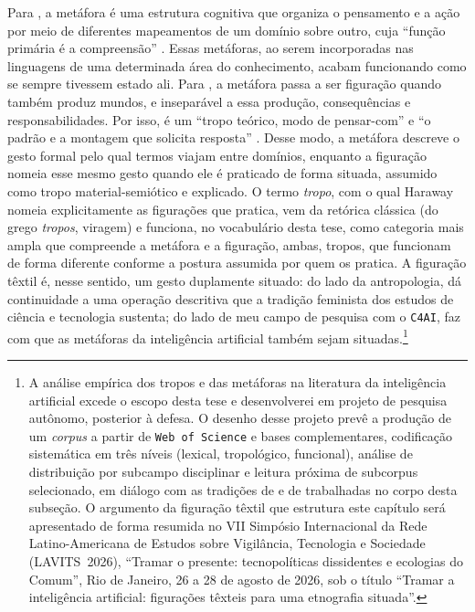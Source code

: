 Para \textcite{LakoffJohnson1980Metaphors}, a metáfora é uma estrutura cognitiva que organiza o pensamento e a ação por meio de diferentes mapeamentos de um domínio sobre outro, cuja \enquote{função primária é a compreensão} \parencite[p.~36, tradução minha]{LakoffJohnson1980Metaphors}. Essas metáforas, ao serem incorporadas nas linguagens de uma determinada área do conhecimento, acabam funcionando como se sempre tivessem estado ali. Para \textcite{Haraway2016Staying}, a metáfora passa a ser figuração quando também produz mundos, e inseparável a essa produção, consequências e responsabilidades. Por isso, é um \enquote{tropo teórico, modo de pensar-com} e \enquote{o padrão e a montagem que solicita resposta} \parencite[p.~3, tradução minha]{Haraway2016Staying}. Desse modo, a metáfora descreve o gesto formal pelo qual termos viajam entre domínios, enquanto a figuração nomeia esse mesmo gesto quando ele é praticado de forma situada, assumido como tropo material-semiótico e explicado. O termo \textit{tropo}, com o qual Haraway nomeia explicitamente as figurações que pratica, vem da retórica clássica (do grego \textit{tropos}, viragem) e funciona, no vocabulário desta tese, como categoria mais ampla que compreende a metáfora e a figuração, ambas, tropos, que funcionam de forma diferente conforme a postura assumida por quem os pratica. A figuração têxtil é, nesse sentido, um gesto duplamente situado: do lado da antropologia, dá continuidade a uma operação descritiva que a tradição feminista dos estudos de ciência e tecnologia sustenta; do lado de meu campo de pesquisa com o \texttt{C4AI}, faz com que as metáforas da inteligência artificial também sejam situadas.\footnote{A análise empírica dos tropos e das metáforas na literatura da inteligência artificial excede o escopo desta tese e desenvolverei em projeto de pesquisa autônomo, posterior à defesa. O desenho desse projeto prevê a produção de um \textit{corpus} a partir de \texttt{Web of Science} e bases complementares, codificação sistemática em três níveis (lexical, tropológico, funcional), análise de distribuição por subcampo disciplinar e leitura próxima de subcorpus selecionado, em diálogo com as tradições de \textcite{LakoffJohnson1980Metaphors} e de \textcite{Haraway2023Ficar} trabalhadas no corpo desta subseção. O argumento da figuração têxtil que estrutura este capítulo será apresentado de forma resumida no VII Simpósio Internacional da Rede Latino-Americana de Estudos sobre Vigilância, Tecnologia e Sociedade (LAVITS~2026), \enquote{Tramar o presente: tecnopolíticas dissidentes e ecologias do Comum}, Rio de Janeiro, 26 a 28 de agosto de 2026, sob o título \enquote{Tramar a inteligência artificial: figurações têxteis para uma etnografia situada}.}

